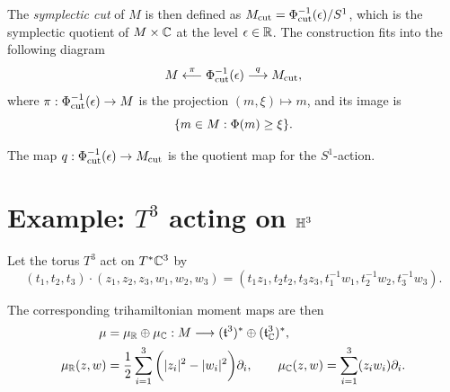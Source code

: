 The \emph{symplectic cut} of $M$ is then defined as $M_{\text{cut}} = \Phi_{\text{cut}}^{-1}(\epsilon)/S^{1}$, which is the symplectic quotient of $M \times \mathbb{C}$ at the level $\epsilon \in \mathbb{R}$. The construction fits into the following diagram
\begin{equation*}
	M \overset{\pi}{\longleftarrow} \Phi_{\text{cut}}^{-1}(\epsilon) \overset{q}{\longrightarrow} M_{\text{cut}},
\end{equation*}
where $\pi:\Phi_{\text{cut}}^{-1}(\epsilon) \rightarrow M$ is the projection $(m,\xi) \mapsto m$, and its image is
\begin{equation*}
	\{ m\in M: \Phi(m) \geq \xi \}.
\end{equation*}

The map $q:\Phi_{\text{cut}}^{-1}(\epsilon) \rightarrow M_{\text{cut}}$ is the quotient map for the $S^{1}$-action.

\newpage



\section{Example: $T^{3}$ acting on $\mathbb{H}^{3}$}

Let the torus $T^{3}$ act on $T^{\ast}\mathbb{C}^{3}$ by
\begin{equation}
	(t_{1}, t_{2}, t_{3})\cdot (z_{1}, z_{2}, z_{3}, w_{1}, w_{2}, w_{3} ) = (t_{1}z_{1}, t_{2}t_{2}, t_{3}z_{3}, t_{1}^{-1}w_{1}, t_{2}^{-1}w_{2}, t_{3}^{-1}w_{3}).
\end{equation}

The corresponding trihamiltonian moment maps are then
\begin{equation*}
	\begin{split}
	\mu &= \mu_{\mathbb{R}} \oplus \mu_{\mathbb{C}} : M \longrightarrow (\mathfrak{t}^{3})^{\ast} \oplus (\mathfrak{t}_{\mathbb{C}}^{3})^{\ast},\\
	\mu_{\mathbb{R}}(z,w) &= \frac{1}{2}\sum_{i = 1}^{3}\bigg( |z_{i}|^{2} - |w_{i}|^{2}\bigg)\partial_{i},\qquad
	\mu_{\mathbb{C}}(z,w) = \sum_{i=1}^{3}(z_{i}w_{i}) \partial_{i}.
	\end{split}
\end{equation*}


